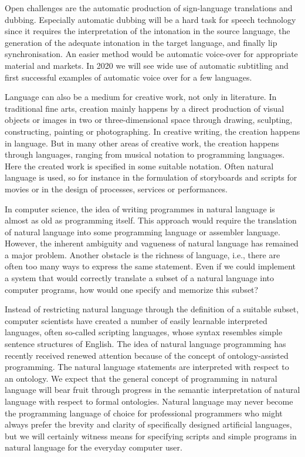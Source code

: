 \documentclass[10pt, plain]{../../metanetpaper}
\begin{document}
\begin{multicols}{2}
Open challenges are the automatic production of sign-language translations and dubbing. Especially automatic dubbing will be a hard task for speech technology since it requires the interpretation of the intonation in the source language, the generation of the adequate intonation in the target language, and finally lip synchronisation. An easier method would be automatic voice-over for appropriate material and markets.  In 2020 we will see wide use of automatic subtitling and first successful examples of automatic voice over for a few languages.
 
Language can also be a medium for creative work, not only in literature. In traditional fine arts, creation mainly happens by a direct production of visual objects or images in two or three-dimensional space through drawing, sculpting, constructing, painting or photographing. In creative writing, the creation happens in language. But in many other areas of creative work, the creation happens through languages, ranging from musical notation to programming languages. Here the created work is specified in some suitable notation. Often natural language is used, so for instance in the formulation of storyboards and scripts for movies or in the design of processes, services or performances.
 
In computer science, the idea of writing programmes in natural language is almost as old as programming itself. This approach would require the translation of natural language into some programming language or assembler language. However, the inherent ambiguity and vagueness of natural language has remained a major problem. Another obstacle is the richness of language, i.e., there are often too many ways to express the same statement. Even if we could implement a system that would correctly translate a subset of a natural language into computer programs, how would one specify and memorize this subset?
 
Instead of restricting natural language through the definition of a suitable subset, computer scientists have created a number of easily learnable interpreted languages, often so-called scripting languages, whose syntax resembles simple sentence structures of English. The idea of natural language programming has recently received renewed attention because of the concept of ontology-assisted programming. The natural language statements are interpreted with respect to an ontology. We expect that the general concept of programming in natural language will bear fruit through progress in the semantic interpretation of natural language with respect to formal ontologies. Natural language may never become the programming language of choice for professional programmers who might always prefer the brevity and clarity of specifically designed artificial languages, but we will certainly witness means for specifying scripts and simple programs in natural language for the everyday computer user.
 

\end{multicols}
\end{document}
